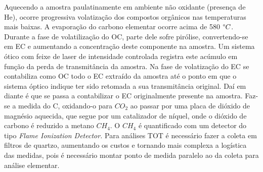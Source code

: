 Aquecendo a amostra paulatinamente em ambiente não oxidante (presença de He),
ocorre progressiva volatização dos compostos orgânicos nas temperaturas mais 
baixas. A evaporação do carbono elementar ocorre acima de 580 $\degree C$.
Durante a fase de volatilização do OC, parte dele sofre pirólise, 
convertendo-se em EC e aumentando a concentração deste componente na amostra. 
Um sistema ótico com feixe de laser de intensidade controlada registra este 
acúmulo em função da perda de transmitância da amostra.
Na fase de volatização do EC se contabiliza como OC todo o EC extraído da 
amostra até o ponto em que o sistema óptico indique ter sido retomada a sua 
transmitância original. Daí em diante é que se passa a contabilizar o EC 
originalmente presente na amostra.
Faz-se a medida do C, oxidando-o para $CO_2$ ao passar por uma placa de dióxido
de magnésio aquecida, que segue por um catalizador de níquel, 
onde o dióxido de carbono é reduzido a metano $CH_4$. O $CH_4$ é quantificado 
com um detector do tipo \textit{Flame Ionization Detector.}
Para análises TOT é necessário fazer a coleta em filtros de quartzo, aumentando 
os custos e tornando mais complexa a logística das medidas, 
pois é necessário montar ponto de medida paralelo ao da coleta para análise
elementar.
